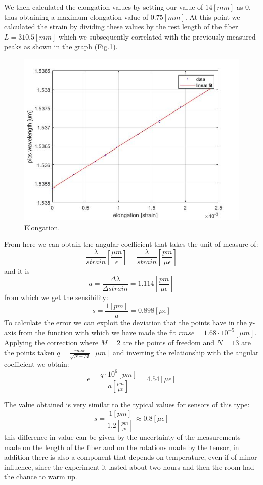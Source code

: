 We then calculated the elongation values by setting our value of $14 [mm]$ as 0, thus obtaining a maximum elongation value of $0.75 [mm]$. At this point we calculated the strain by dividing these values by the rest length of the fiber $L = 310.5 [mm]$ which we subsequently correlated with the previously measured peaks as shown in the graph (Fig.\ref{fig:spins}).
\begin{figure}[h]
    \centering
    \includegraphics[scale=0.7]{img/spins.jpg}
    \caption{Elongation.}
    \label{fig:spins}
\end{figure}
From here we can obtain the angular coefficient that takes the unit of measure of:
$$\frac{\lambda}{strain}\left[\frac{\mu m}{\epsilon}\right] = \frac{\lambda}{strain}\left[\frac{pm}{\mu\epsilon}\right]$$
and it is
$$a = \frac{\Delta \lambda}{ \Delta strain} = 1.114 \left[\frac{pm}{\mu\epsilon}\right]$$
from which we get the sensibility:
$$s = \frac{1[pm]}{a} = 0.898 [\mu\epsilon]$$
To calculate the error we can exploit the deviation that the points have in the y-axis from the function with which we have made the fit $rmse = 1.68\cdot10^{-5} [\mu m]$. Applying the correction where $M = 2$ are the points of freedom and $N = 13$ are the points taken $q = \frac{rmse}{\sqrt{N - M}} [\mu m]$ and inverting the relationship with the angular coefficient we obtain:
$$e = \frac{q \cdot 10^{6} [pm]}{a \left[\frac{pm}{\mu\epsilon}\right]} = 4.54 [\mu\epsilon]$$

\newpage
{}
The value obtained is very similar to the typical values for sensors of this type:
$$s = \frac{1 [pm]}{ 1.2 \left[\frac{pm}{\mu\epsilon}\right]} \approx 0.8 [\mu \epsilon]$$
this difference in value can be given by the uncertainty of the measurements made on the length of the fiber and on the rotations made by the tensor, in addition there is also a component that depends on temperature, even if of minor influence, since the experiment it lasted about two hours and then the room had the chance to warm up.


